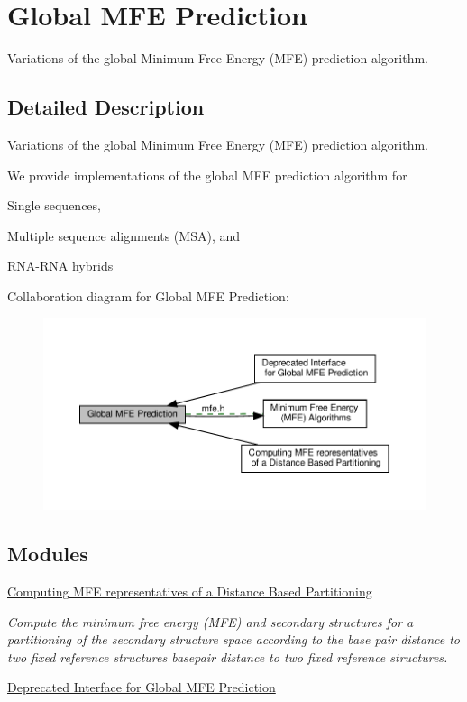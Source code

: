 \hypertarget{group__mfe__global}{}\section{Global M\+FE Prediction}
\label{group__mfe__global}


Variations of the global Minimum Free Energy (M\+FE) prediction algorithm.  




\subsection{Detailed Description}
Variations of the global Minimum Free Energy (M\+FE) prediction algorithm. 

We provide implementations of the global M\+FE prediction algorithm for
\begin{DoxyItemize}
\item Single sequences,
\item Multiple sequence alignments (M\+SA), and
\item R\+N\+A-\/\+R\+NA hybrids 
\end{DoxyItemize}Collaboration diagram for Global M\+FE Prediction\+:
\nopagebreak
\begin{figure}[H]
\begin{center}
\leavevmode
\includegraphics[width=350pt]{group__mfe__global}
\end{center}
\end{figure}
\subsection*{Modules}
\begin{DoxyCompactItemize}
\item 
\hyperlink{group__kl__neighborhood__mfe}{Computing M\+F\+E representatives of a Distance Based Partitioning}
\begin{DoxyCompactList}\small\item\em Compute the minimum free energy (M\+FE) and secondary structures for a partitioning of the secondary structure space according to the base pair distance to two fixed reference structures basepair distance to two fixed reference structures. \end{DoxyCompactList}\item 
\hyperlink{group__mfe__global__deprecated}{Deprecated Interface for Global M\+F\+E Prediction}
\end{DoxyCompactItemize}
